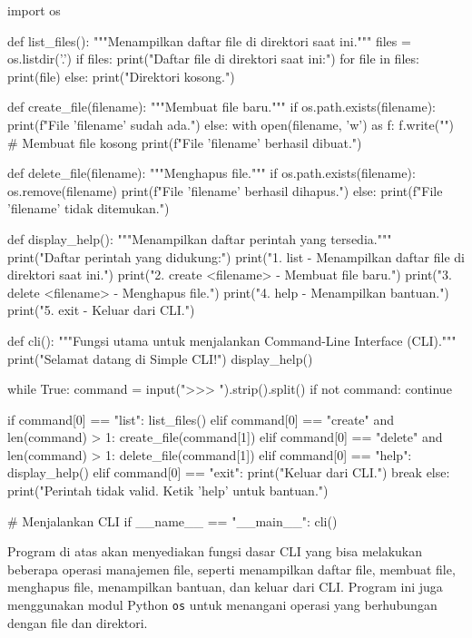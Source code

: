 \documentclass[12pt]{article}
\begin{document}
\begin{python}
import os

def list_files():
    """Menampilkan daftar file di direktori saat ini."""
    files = os.listdir('.')
    if files:
        print("Daftar file di direktori saat ini:")
        for file in files:
            print(file)
    else:
        print("Direktori kosong.")

def create_file(filename):
    """Membuat file baru."""
    if os.path.exists(filename):
        print(f"File '{filename}' sudah ada.")
    else:
        with open(filename, 'w') as f:
            f.write("")  # Membuat file kosong
        print(f"File '{filename}' berhasil dibuat.")

def delete_file(filename):
    """Menghapus file."""
    if os.path.exists(filename):
        os.remove(filename)
        print(f"File '{filename}' berhasil dihapus.")
    else:
        print(f"File '{filename}' tidak ditemukan.")

def display_help():
    """Menampilkan daftar perintah yang tersedia."""
    print("Daftar perintah yang didukung:")
    print("1. list                - Menampilkan daftar file di direktori saat ini.")
    print("2. create <filename>    - Membuat file baru.")
    print("3. delete <filename>    - Menghapus file.")
    print("4. help                - Menampilkan bantuan.")
    print("5. exit                - Keluar dari CLI.")

def cli():
    """Fungsi utama untuk menjalankan Command-Line Interface (CLI)."""
    print("Selamat datang di Simple CLI!")
    display_help()
    
    while True:
        command = input(">>> ").strip().split()
        if not command:
            continue
        
        if command[0] == "list":
            list_files()
        elif command[0] == "create" and len(command) > 1:
            create_file(command[1])
        elif command[0] == "delete" and len(command) > 1:
            delete_file(command[1])
        elif command[0] == "help":
            display_help()
        elif command[0] == "exit":
            print("Keluar dari CLI.")
            break
        else:
            print("Perintah tidak valid. Ketik 'help' untuk bantuan.")

# Menjalankan CLI
if __name__ == "__main__":
    cli()
\end{python}

Program di atas akan menyediakan fungsi dasar CLI yang bisa melakukan beberapa operasi manajemen file, seperti menampilkan daftar file, membuat file, menghapus file, menampilkan bantuan, dan keluar dari CLI. Program ini juga menggunakan modul Python \texttt{os} untuk menangani operasi yang berhubungan dengan file dan direktori.
\end{document}
